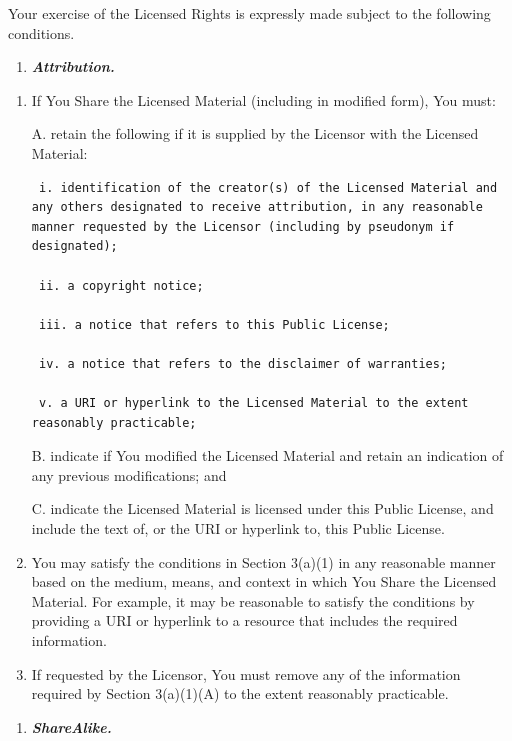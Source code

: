 \documentclass[]{book}
\providecommand{\tightlist}{%
  \setlength{\itemsep}{0pt}\setlength{\parskip}{0pt}}
\begin{document}
Your exercise of the Licensed Rights is expressly made subject to the
following conditions.

\begin{enumerate}
\def\labelenumi{\alph{enumi}.}
\tightlist
\item
  \textbf{\emph{Attribution.}}
\end{enumerate}

\begin{enumerate}
\def\labelenumi{\arabic{enumi}.}
\item
  If You Share the Licensed Material (including in modified form), You
  must:

  A. retain the following if it is supplied by the Licensor with the
  Licensed Material:

\begin{verbatim}
 i. identification of the creator(s) of the Licensed Material and any others designated to receive attribution, in any reasonable manner requested by the Licensor (including by pseudonym if designated);

 ii. a copyright notice;

 iii. a notice that refers to this Public License;

 iv. a notice that refers to the disclaimer of warranties;

 v. a URI or hyperlink to the Licensed Material to the extent reasonably practicable;
\end{verbatim}

  B. indicate if You modified the Licensed Material and retain an
  indication of any previous modifications; and

  C. indicate the Licensed Material is licensed under this Public
  License, and include the text of, or the URI or hyperlink to, this
  Public License.
\item
  You may satisfy the conditions in Section 3(a)(1) in any reasonable
  manner based on the medium, means, and context in which You Share the
  Licensed Material. For example, it may be reasonable to satisfy the
  conditions by providing a URI or hyperlink to a resource that includes
  the required information.
\item
  If requested by the Licensor, You must remove any of the information
  required by Section 3(a)(1)(A) to the extent reasonably practicable.
\end{enumerate}

\begin{enumerate}
\def\labelenumi{\alph{enumi}.}
\setcounter{enumi}{1}
\tightlist
\item
  \textbf{\emph{ShareAlike.}}
\end{enumerate}
\end{document}
